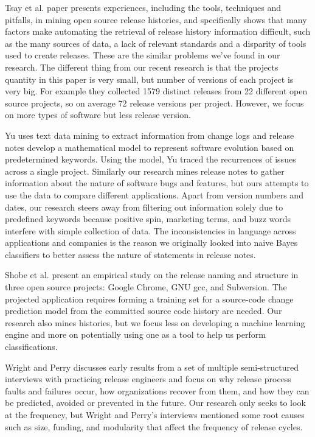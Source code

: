 \documentclass{acm_proc_article-sp}
\begin{document}
Tsay et al. \cite{TsayOpenSourceMining} paper presents experiences, including the tools, techniques and pitfalls, in mining open source release histories, and specifically shows that many factors make automating the retrieval of release history information difficult, such as the many sources of data, a lack of relevant standards and a disparity of tools used to create releases. These are the similar problems we've found in our research.
The different thing from our recent research is that the projects quantity in this paper is very small, but number of versions of each project is very big. For example they collected 1579 distinct releases from 22 different open source projects, so on average 72 release versions per project. However, we focus on more types of software but less release version.

Yu \cite{YuChangeLogs} uses text data mining to extract information from change logs and release notes develop a mathematical model to represent software evolution based on predetermined keywords. Using the model, Yu traced the recurrences of issues across a single project.
Similarly our research mines release notes to gather information about the nature of software bugs and features, but ours attempts to use the data to compare different applications. 
Apart from version numbers and dates, our research steers away from filtering out information solely due to predefined keywords because positive spin, marketing terms, and buzz words interfere with simple collection of data. 
The inconsistencies in language across applications and companies is the reason we originally looked into naive Bayes classifiers to better assess the nature of statements in release notes.

Shobe et al. \cite{ShobeMapping} present an empirical study on the release naming and structure in three open source projects: Google Chrome, GNU gcc, and Subversion.  
The projected application requires forming a training set for a source-code change prediction model from the committed source code history are needed.
Our research also mines histories, but we focus less on developing a machine learning engine and more on potentially using one as a tool to help us perform classifications.

Wright and Perry \cite{WrightPitfalls} discusses early results from a set of multiple semi-structured interviews with practicing release engineers and focus on why release process faults and failures occur, how organizations recover from them, and how they can be predicted, avoided or prevented in the future.
Our research only seeks to look at the frequency, but Wright and Perry's interviews mentioned some root causes such as size, funding, and modularity that affect the frequency of release cycles.



\end{document}
